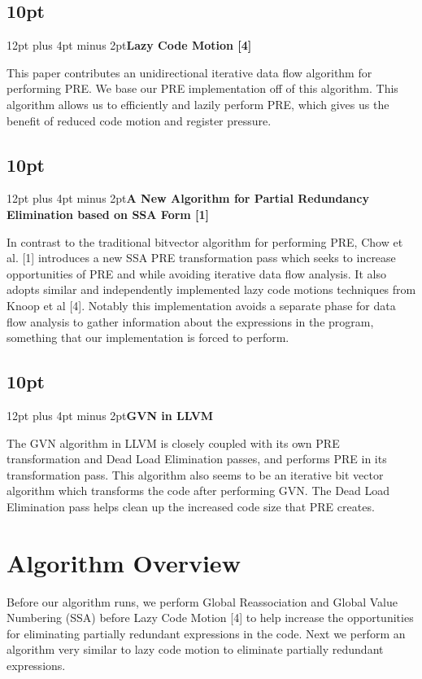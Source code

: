 \documentclass[onecolumn,10pt]{journal}
\begin{document}
\noindent\titlespacing\subsection*{10pt}{12pt plus 4pt minus 2pt}\textbf{Lazy Code Motion [4]}

\noindent This paper contributes an unidirectional iterative data flow algorithm for performing PRE. We base our PRE implementation off of this algorithm. This algorithm allows us to efficiently and lazily perform PRE, which gives us the benefit of reduced code motion and register pressure.

\noindent\titlespacing\subsection*{10pt}{12pt plus 4pt minus 2pt}\textbf{A New Algorithm for Partial Redundancy Elimination based on SSA Form [1]}

\noindent In contrast to the traditional bitvector algorithm for performing PRE, Chow et al. [1] introduces a new SSA PRE transformation pass which seeks to increase opportunities of PRE and while avoiding iterative data flow analysis. It also adopts similar and independently implemented lazy code motions techniques from Knoop et al [4]. Notably this implementation avoids a separate phase for data flow analysis to gather information about the expressions in the program, something that our implementation is forced to perform.

\pagebreak

\noindent\titlespacing\subsection*{10pt}{12pt plus 4pt minus 2pt}\textbf{GVN in LLVM}

\noindent The GVN algorithm in LLVM is closely coupled with its own PRE transformation and Dead Load Elimination passes, and performs PRE in its transformation pass. This algorithm also seems to be an iterative bit vector algorithm which transforms the code after performing GVN. The Dead Load Elimination pass helps clean up the increased code size that PRE creates. 

\section{Algorithm Overview}

Before our algorithm runs, we perform Global Reassociation and Global Value Numbering (SSA) before Lazy Code Motion [4] to help increase the opportunities for eliminating partially redundant expressions in the code. Next we perform an algorithm very similar to lazy code motion to eliminate partially redundant expressions. 
\end{document}

